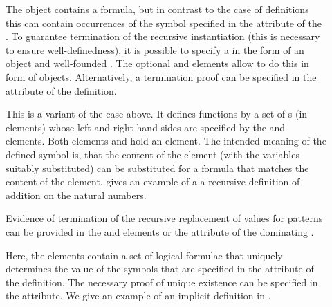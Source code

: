 \begin{description}
\item[{}] The {\openmath} object contains a
  formula, but in contrast to the case of {}
  definitions this can contain occurrences of the symbol specified in the
  {} attribute of the {}. To
  guarantee termination of the recursive instantiation (this is necessary to
  ensure well-definedness), it is possible to specify a {} in the form of an {\openmath} object and well-founded
  {}. The optional {} and {}
  elements allow to do this in form of {\openmath} objects. Alternatively, a
  termination proof can be specified in the {}
  attribute of the definition.
\item[{}] This is a variant of the
  {} case above. It defines functions by a set
  of {s} (in
  {} elements) whose left and right hand sides are specified by
  the {} and {} elements.  Both elements
  {} and {} hold an {\openmath} element. The
  intended meaning of the defined symbol is, that the content of the
  {} element (with the variables suitably substituted) can be
  substituted for a formula that matches the content of the {}
  element. {} gives an example of a a recursive definition of
  addition on the natural numbers.
  
  Evidence of termination of the recursive replacement of values for patterns can
  be provided in the {} and {} elements or the
  {} attribute of the dominating
  {}.
\item[{}] Here, the {} elements
  contain a set of logical formulae that uniquely determines the value of the
  symbols that are specified in the {} attribute of the
  definition. The necessary proof of unique existence can be specified in the
  {} attribute.  We give an example of an implicit
  definition in {}.
\end{description}
